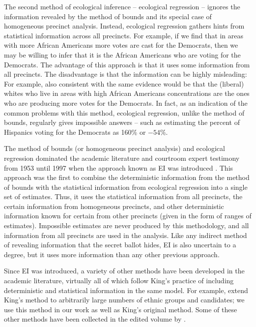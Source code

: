\documentclass[12pt]{article}
\begin{document}
The second method of ecological inference -- ecological regression --
ignores the information revealed by the method of bounds and its
special case of homogeneous precinct analysis. Instead, ecological
regression gathers hints from statistical information across all
precincts. For example, if we find that in areas with more African
Americans more votes are cast for the Democrats, then we may be
willing to infer that it is the African Americans who are voting for
the Democrats. The advantage of this approach is that it uses some
information from all precincts. The disadvantage is that the
information can be highly misleading: For example, also consistent
with the same evidence would be that the (liberal) whites who live in
areas with high African Americans concentrations are the ones who are
producing more votes for the Democrats. In fact, as an indication of
the common problems with this method, ecological regression, unlike
the method of bounds, regularly gives impossible answers -- such as
estimating the percent of Hispanics voting for the Democrats as 160\%
or $-54$\%.

The method of bounds (or homogeneous precinct analysis) and ecological
regression dominated the academic literature and courtroom expert
testimony from 1953 until 1997 when the approach known as EI was
introduced \citep{King97}. This approach was the first to combine the
deterministic information from the method of bounds with the
statistical information from ecological regression into a single set
of estimates. Thus, it uses the statistical information from all
precincts, the certain information from homogeneous precincts, and
other deterministic information known for certain from other precincts
(given in the form of ranges of estimates).  Impossible estimates are
never produced by this methodology, and all information from all
precincts are used in the analysis. Like any indirect method of
revealing information that the secret ballot hides, EI is also
uncertain to a degree, but it uses more information than any other
previous approach.

Since EI was introduced, a variety of other methods have been
developed in the academic literature, virtually all of which follow
King's practice of including deterministic and statistical information
in the same model.  For example, \citet{RosJiaKin01} extend King's
method to arbitrarily large numbers of ethnic groups and candidates;
we use this method in our work as well as King's original method. Some
of these other methods have been collected in the edited volume by
\citet{KinRosTan04b}.
\end{document}
